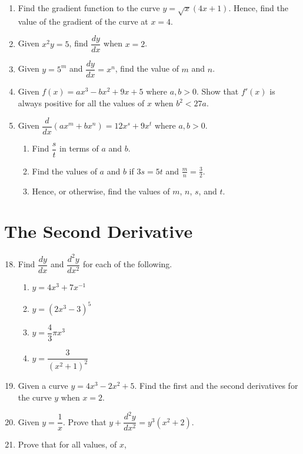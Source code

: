 \documentclass{report}
\begin{document}
\begin{multicols*}{2}
\begin{enumerate}
        \item Find the gradient function to the curve $y = \sqrt{x}(4x+1)$. Hence, find the
              value of the gradient of the curve at $x = 4$.
        \item Given $x^2y = 5$, find $\dfrac{dy}{dx}$ when $x = 2$.
        \item Given $y = 5^m$ and $\dfrac{dy}{dx} = x^n$, find the value of $m$ and $n$.
        \item Given $f(x) = ax^3 - bx^2 + 9x + 5$ where $a, b > 0$. Show that $f'(x)$ is
              always positive for all the values of $x$ when $b^2 < 27a$.
        \item Given $\dfrac{d}{dx}(ax^m + bx^n) = 12x^s + 9x^t$ where $a, b > 0$.
              \begin{enumerate}
                  \item Find $\dfrac{s}{t}$ in terms of $a$ and $b$.
                  \item Find the values of $a$ and $b$ if $3s = 5t$ and $\frac{m}{n} = \frac{3}{2}$.
                  \item Hence, or otherwise, find the values of $m$, $n$, $s$, and $t$.
              \end{enumerate}
    \end{enumerate}
    \section{The Second Derivative}
    \begin{enumerate}
        \setcounter{enumi}{17}
        \item Find $\dfrac{dy}{dx}$ and $\dfrac{d^2y}{dx^2}$ for each of the following.
              \begin{enumerate}
                  \item $y = 4x^3 + 7x^{-1}$
                  \item $y = {(2x^3-3)}^5$
                  \item $y = \dfrac{4}{3}\pi x^3$
                  \item $y = \dfrac{3}{{(x^2 + 1)}^2}$
              \end{enumerate}
        \item Given a curve $y = 4x^3 - 2x^2 + 5$. Find the first and the second derivatives
              for the curve $y$ when $x = 2$.
        \item Given $y = \dfrac{1}{x}$. Prove that $y + \dfrac{d^2y}{dx^2} = y^3(x^2 + 2)$.
        \item Prove that for all values, of $x$,


\end{enumerate}
\end{multicols*}
\end{document}

